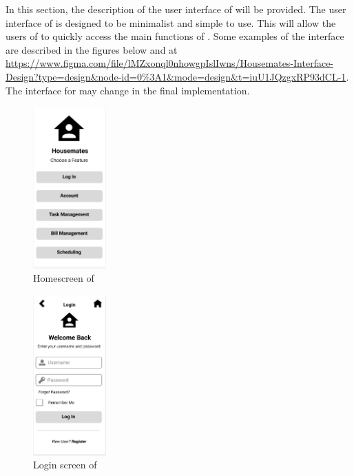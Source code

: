 \documentclass[12pt, titlepage]{article}
\begin{document}
In this section, the description of the user interface of \progname{} will be provided. The user interface of \progname{} is designed to be minimalist and simple to use. This will allow the users of \progname{} to quickly access the main functions of \progname{}. Some examples of the interface are described in the figures below and at \url{https://www.figma.com/file/lMZxonql0nhowgpIslIwns/Housemates-Interface-Design?type=design&node-id=0%3A1&mode=design&t=iuU1JQzgxRP93dCL-1}. The interface for \progname{} may change in the final implementation.

\begin{figure}[H]
\centering
\includegraphics[width=0.25\textwidth]{Homescreen.png}
\caption{Homescreen of \progname{}}
\label{FigHome}
\end{figure}

\begin{figure}[H]
\centering
\includegraphics[width=0.25\textwidth]{Login.png}
\caption{Login screen of \progname{}}
\label{FigLogin}
\end{figure}
\end{document}
